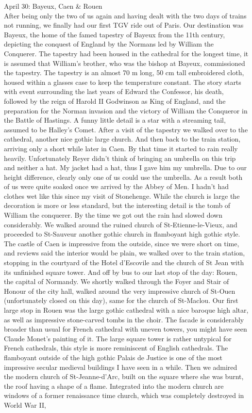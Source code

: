 April 30: Bayeux, Caen \& Rouen\\
After being only the two of us again and having dealt with the two days of trains not running, we finally had our first TGV ride out of Paris. Our destination was Bayeux, the home of the famed tapestry of Bayeux from the 11th century, depicting the conquest of England by the Normans led by William the Conquerer. The tapestry had been housed in the cathedral for the longest time, it is assumed that William's brother, who was the bishop at Bayeux, commissioned the tapestry. The tapestry is an almost 70 m long, 50 cm tall embroidered cloth, housed within a glasses case to keep the temperature constant. The story starts with event surrounding the last years of Edward the Confessor, his death, followed by the reign of Harold II Godwinson as King of England, and the preparation for the Norman invasion and the victory of William the Conqueror in the Battle of Hastings. A funny little detail is a star with a streaming tail, assumed to be Halley's Comet. After a visit of the tapestry we walked over to the cathedral, another nice gothic large church. And then back to the train station, arriving only a short while later in Caen. By that time it started to rain really heavily. Unfortunately Reyer didn't think of bringing an umbrella on this trip and neither a hat. My jacket had a hat, thus I gave him my umbrella. Due to our height difference, clearly only one of us could use the umbrella. As a result both of us were quite soaked once we arrived by the Abbey of Men. I hadn't had clothes wet like this since my visit of Stonehenge. While the church is large the decoration is more or less standard, but the interesting detail is the tomb of William the conquerer. By the time we got out the rain had slowed down considerably. We walked around the ruined church of St-Etienne-le-Vieux, and proceeded to St-Sauveur another gothic church in flamboyant high gothic style. The castle of Caen is impressive from the outside, since we were short on time, and reviews said the interior would be plain, we walked over to the train station, stopping in the courtyard of the Hotel d'Escovile and the church of St Jean with its unfinished square tower. And off by bus to our last stop of the day: Rouen, the capital of Normandy. We shortly walked through the Foyer and Stair of Honour of the city hall, walked around the very impressive church of St-Ouen (unfortunately closed on this day), same for the church of St-Maclou. Our first large stop in Rouen was the large gothic cathedral with a nice baroque high altar, as well as impressive stone-carved tombs in the choir. The facade is considerably broader than usual for French cathedral with uneven towers, you might have seen Claude Monet's painting of it. The large square tower is rather untypical for French cathedrals, this style is more reminiscent of English cathedrals. The flamboyant outside of the high gothic Palais de Justice is one of the most impressive secular medieval buildings I have seen in a while. Then we admired the modern church of St-Jeanne-d'Arc, built on the square where she was burnt, the roof having a shape of a flame. Integrated into the modern church are windows of a former renaissance time church, which was completely destroyed in World War II, 